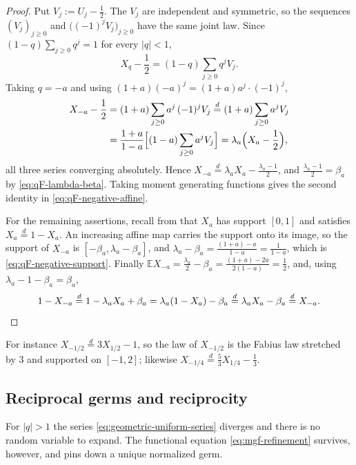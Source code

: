 \documentclass[11pt,oneside,openany]{book}
\theoremstyle{definition}
\theoremstyle{remark}
\newcommand{\abs}[1]{\lvert #1\rvert}
\newcommand{\defeq}{\mathrel{:=}}
\begin{document}
\begin{proof}
Put $V_j\defeq U_j-\tfrac12$.  The $V_j$ are independent and symmetric, so the
sequences $(V_j)_{j\ge0}$ and $\bigl((-1)^jV_j\bigr)_{j\ge0}$ have the same
joint law.  Since $(1-q)\sum_{j\ge0}q^j=1$ for every $\abs q<1$,
\[
 X_q-\frac12=(1-q)\sum_{j\ge0}q^jV_j .
\]
Taking $q=-a$ and using $(1+a)(-a)^j=(1+a)a^j\cdot(-1)^j$,
\begin{align*}
 X_{-a}-\frac12
 &=(1+a)\sum_{j\ge0}a^j\,(-1)^jV_j
 \overset d=(1+a)\sum_{j\ge0}a^jV_j\\
 &=\frac{1+a}{1-a}\Bigl[(1-a)\sum_{j\ge0}a^jV_j\Bigr]
 =\lambda_a\Bigl(X_a-\frac12\Bigr),
\end{align*}
all three series converging absolutely.  Hence
$X_{-a}\overset d=\lambda_aX_a-\tfrac{\lambda_a-1}2$, and
$\tfrac{\lambda_a-1}2=\beta_a$ by \eqref{eq:qF-lambda-beta}.  Taking moment
generating functions gives the second identity in
\eqref{eq:qF-negative-affine}.

For the remaining assertions, recall from 
that $X_a$ has support $[0,1]$ and satisfies $X_a\overset d=1-X_a$.  An
increasing affine map carries the support onto its image, so the support of
$X_{-a}$ is $[-\beta_a,\lambda_a-\beta_a]$, and
$\lambda_a-\beta_a=\frac{(1+a)-a}{1-a}=\frac1{1-a}$, which is
\eqref{eq:qF-negative-support}.  Finally
$\mathbb EX_{-a}=\tfrac{\lambda_a}2-\beta_a=\frac{(1+a)-2a}{2(1-a)}=\tfrac12$,
and, using $\lambda_a-1-\beta_a=\beta_a$,
\[
 1-X_{-a}\overset d=1-\lambda_aX_a+\beta_a
 =\lambda_a(1-X_a)-\beta_a
 \overset d=\lambda_aX_a-\beta_a
 \overset d=X_{-a}. \qedhere
\]
\end{proof}

For instance $X_{-1/2}\overset d=3X_{1/2}-1$, so the law of $X_{-1/2}$ is the
Fabius law stretched by $3$ and supported on $[-1,2]$; likewise
$X_{-1/4}\overset d=\tfrac53X_{1/4}-\tfrac13$.


\subsection{Reciprocal germs and reciprocity}

For $\abs q>1$ the series \eqref{eq:geometric-uniform-series} diverges and there
is no random variable to expand.  The functional equation \eqref{eq:mgf-refinement}
survives, however, and pins down a unique normalized germ.
\end{document}
